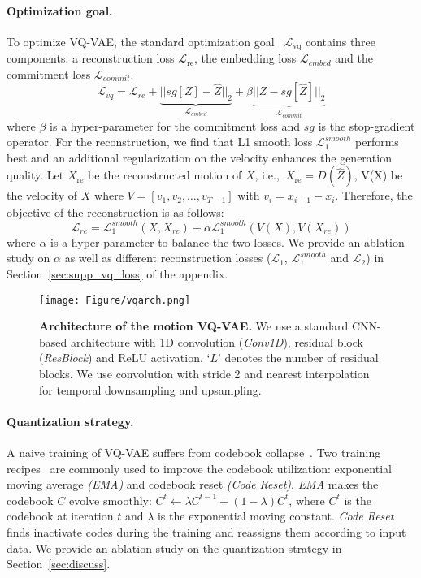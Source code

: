 \documentclass[10pt,twocolumn,letterpaper]{article}
\begin{document}
\paragraph{Optimization goal.} To optimize VQ-VAE, the standard optimization goal~\cite{van2017neural} $\mathcal{L}_{\text{vq}}$ contains three components: a reconstruction loss $\mathcal{L}_{\text{re}}$, the embedding loss $\mathcal{L}_{embed}$ and the commitment loss $\mathcal{L}_{commit}$. 
\begin{equation}
\mathcal{L}_{vq} = \mathcal{L}_{re} + \underbrace{||\mathit{sg}[Z] - \hat{Z}||_2}_{\mathcal{L}_{embed}} + \beta \underbrace{||Z - \mathit{sg}[\hat{Z}]||_2}_{\mathcal{L}_{commit}}
\label{formula:2}
\end{equation}
where $\beta$ is a hyper-parameter for the commitment loss and $\mathit{sg}$ is the stop-gradient operator. For the reconstruction, we find that L1 smooth loss $\mathcal{L}_1^{smooth}$ performs best and an additional regularization on the velocity enhances the generation quality. Let $X_{\text{re}}$ be the reconstructed motion of $X$, i.e.,~$X_{\text{re}}=D(\hat{Z})$, V(X) be the velocity of $X$ where $V = [v_1, v_2, \ldots, v_{T-1}]$ with $v_i = x_{i+1} - x_i$. Therefore, the objective of the reconstruction is as follows:
\begin{equation}
\mathcal{L}_{re} = \mathcal{L}_1^{smooth}(X, X_{re}) + \alpha \mathcal{L}_1^{smooth}(V(X), V(X_{re}))
\label{formula:3}
\end{equation}
where $\alpha$ is a hyper-parameter to balance the two losses. We provide an ablation study on $\alpha$ as well as different reconstruction losses ($\mathcal{L}_1$, $\mathcal{L}_1^{smooth}$ and $\mathcal{L}_2$) in Section~\ref{sec:supp_vq_loss} of the appendix. 

\begin{figure}[t]
    \centering
    \texttt{[image: Figure/vqarch.png]}
    \caption{\textbf{Architecture of the motion VQ-VAE.} We use a standard CNN-based architecture with 1D convolution (\textit{Conv1D}), residual block (\textit{ResBlock}) and ReLU activation. `$L$' denotes the number of residual blocks. We use convolution with stride 2 and nearest interpolation for temporal downsampling and upsampling.}
    \label{fig:vqarch}
\end{figure}


\paragraph{Quantization strategy.} A naive training of VQ-VAE suffers from codebook collapse~\cite{van2017neural,razavi2019generating}. Two training recipes~\cite{razavi2019generating} are commonly used to improve the codebook utilization: exponential moving average \textit{(EMA)} and codebook reset \textit{(Code Reset)}. \textit{EMA} makes the codebook $C$ evolve smoothly: $C^t \leftarrow \lambda C^{t-1} + (1 - \lambda) C^{t}$, where $C^t$ is the codebook at iteration $t$ and $\lambda$ is the exponential moving constant. \textit{Code Reset} finds inactivate codes during the training and reassigns them according to input data. We provide an ablation study on the quantization strategy in Section~\ref{sec:discuss}.
\end{document}
